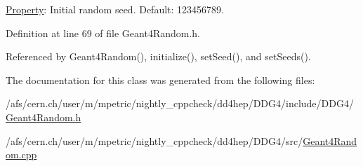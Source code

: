 \hyperlink{class_d_d4hep_1_1_property}{Property}: Initial random seed. Default: 123456789. 

Definition at line 69 of file Geant4Random.h.

Referenced by Geant4Random(), initialize(), setSeed(), and setSeeds().

The documentation for this class was generated from the following files:\begin{DoxyCompactItemize}
\item 
/afs/cern.ch/user/m/mpetric/nightly\_\-cppcheck/dd4hep/DDG4/include/DDG4/\hyperlink{_geant4_random_8h}{Geant4Random.h}\item 
/afs/cern.ch/user/m/mpetric/nightly\_\-cppcheck/dd4hep/DDG4/src/\hyperlink{_geant4_random_8cpp}{Geant4Random.cpp}\end{DoxyCompactItemize}
